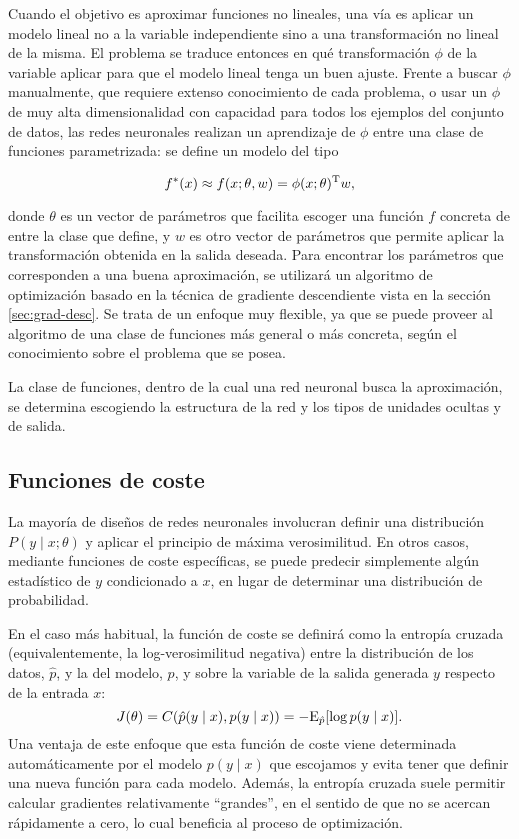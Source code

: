 Cuando el objetivo es aproximar funciones no lineales, una vía es
aplicar un modelo lineal no a la variable independiente sino a una
transformación no lineal de la misma. El problema se traduce entonces en
qué transformación \(\phi\) de la variable aplicar para que el modelo
lineal tenga un buen ajuste. Frente a buscar \(\phi\) manualmente, que
requiere extenso conocimiento de cada problema, o usar un \(\phi\) de
muy alta dimensionalidad con capacidad para todos los ejemplos del
conjunto de datos, las redes neuronales realizan un aprendizaje de
\(\phi\) entre una clase de funciones parametrizada: se define un modelo
del tipo

\begin{equation}
  f^{*}(x)\approx f(x;\theta,w)=\phi(x;\theta)^{\mathrm{T}}w, 
\end{equation}

donde \(\theta\) es un vector de parámetros que facilita escoger una
función \(f\) concreta de entre la clase que define, y \(w\) es otro
vector de parámetros que permite aplicar la transformación obtenida en
la salida deseada. Para encontrar los parámetros que corresponden a una
buena aproximación, se utilizará un algoritmo de optimización basado en
la técnica de gradiente descendiente vista en la sección
\ref{sec:grad-desc}. Se trata de un enfoque muy flexible, ya que se
puede proveer al algoritmo de una clase de funciones más general o más
concreta, según el conocimiento sobre el problema que se posea.

La clase de funciones, dentro de la cual una red neuronal busca la
aproximación, se determina escogiendo la estructura de la red y los
tipos de unidades ocultas y de salida.

\subsection{Funciones de coste}\label{funciones-de-coste}

La mayoría de diseños de redes neuronales involucran definir una
distribución \(P(y\mid x;\theta)\) y aplicar el principio de máxima
verosimilitud. En otros casos, mediante funciones de coste específicas,
se puede predecir simplemente algún estadístico de \(y\) condicionado a
\(x\), en lugar de determinar una distribución de probabilidad.

En el caso más habitual, la función de coste se definirá como la
entropía cruzada (equivalentemente, la log-verosimilitud negativa) entre
la distribución de los datos, \(\hat p\), y la del modelo, \(p\), y
sobre la variable de la salida generada \(y\) respecto de la entrada
\(x\):
\[J(\theta)=C(\hat p(y\mid x), p(y\mid x))=-\mathrm{E}_{\hat p}[\log p(y\mid x)].\]
Una ventaja de este enfoque que esta función de coste viene determinada
automáticamente por el modelo \(p(y\mid x)\) que escojamos y evita tener
que definir una nueva función para cada modelo. Además, la entropía
cruzada suele permitir calcular gradientes relativamente ``grandes'', en
el sentido de que no se acercan rápidamente a cero, lo cual beneficia al
proceso de optimización.

